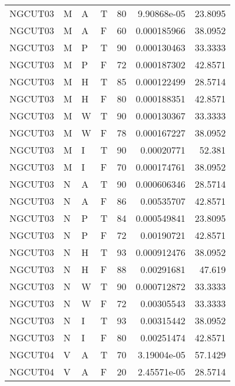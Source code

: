 \begin{longtable}{llllrrr}
    NGCUT03  & M     & A     & T          & 80         & 9.90868e-05 & 23.8095  \\
    NGCUT03  & M     & A     & F          & 60         & 0.000185966 & 38.0952  \\
    NGCUT03  & M     & P     & T          & 90         & 0.000130463 & 33.3333  \\
    NGCUT03  & M     & P     & F          & 72         & 0.000187302 & 42.8571  \\
    NGCUT03  & M     & H     & T          & 85         & 0.000122499 & 28.5714  \\
    NGCUT03  & M     & H     & F          & 80         & 0.000188351 & 42.8571  \\
    NGCUT03  & M     & W     & T          & 90         & 0.000130367 & 33.3333  \\
    NGCUT03  & M     & W     & F          & 78         & 0.000167227 & 38.0952  \\
    NGCUT03  & M     & I     & T          & 90         & 0.00020771  & 52.381   \\
    NGCUT03  & M     & I     & F          & 70         & 0.000174761 & 38.0952  \\
    NGCUT03  & N     & A     & T          & 90         & 0.000606346 & 28.5714  \\
    NGCUT03  & N     & A     & F          & 86         & 0.00535707  & 42.8571  \\
    NGCUT03  & N     & P     & T          & 84         & 0.000549841 & 23.8095  \\
    NGCUT03  & N     & P     & F          & 72         & 0.00190721  & 42.8571  \\
    NGCUT03  & N     & H     & T          & 93         & 0.000912476 & 38.0952  \\
    NGCUT03  & N     & H     & F          & 88         & 0.00291681  & 47.619   \\
    NGCUT03  & N     & W     & T          & 90         & 0.000712872 & 33.3333  \\
    NGCUT03  & N     & W     & F          & 72         & 0.00305543  & 33.3333  \\
    NGCUT03  & N     & I     & T          & 93         & 0.00315442  & 38.0952  \\
    NGCUT03  & N     & I     & F          & 80         & 0.00251474  & 42.8571  \\
    NGCUT04  & V     & A     & T          & 70         & 3.19004e-05 & 57.1429  \\
    NGCUT04  & V     & A     & F          & 20         & 2.45571e-05 & 28.5714  \\

\end{longtable}

